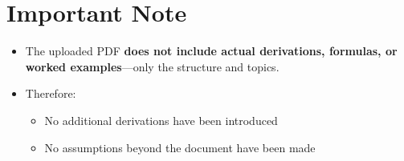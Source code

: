 \documentclass[12pt]{article}
\begin{document}
\section*{Important Note}

\begin{itemize}
    \item The uploaded PDF \textbf{does not include actual derivations, formulas, or worked examples}—only the structure and topics.
    \item Therefore:
    \begin{itemize}
        \item No additional derivations have been introduced
        \item No assumptions beyond the document have been made
    \end{itemize}
\end{itemize}
\end{document}
